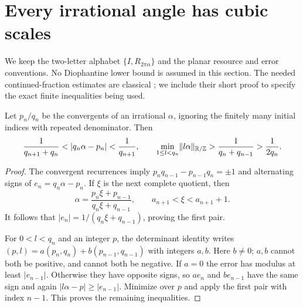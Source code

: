 \section{Every irrational angle has cubic scales}\label{sec:irrational}
We keep the two-letter alphabet $\{I,R_{2\pi\alpha}\}$ and the planar resource and error conventions. No Diophantine lower bound is assumed in this section. The needed continued-fraction estimates are classical \cite{Cassels}; we include their short proof to specify the exact finite inequalities being used.

\begin{lemma}\label{lem:cf}
Let $p_n/q_n$ be the convergents of an irrational $\alpha$, ignoring the finitely many initial indices with repeated denominator. Then
\begin{equation}\label{eq:cf-estimates}
 \frac1{q_{n+1}+q_n}<|q_n\alpha-p_n|<\frac1{q_{n+1}},
 \qquad
 \min_{1\le l<q_n}\norm{l\alpha}_{\R/\Z}>
                  \frac1{q_n+q_{n-1}}>\frac1{2q_n}.
\end{equation}
\end{lemma}
\begin{proof}
The convergent recurrences imply
$p_nq_{n-1}-p_{n-1}q_n=\pm1$ and alternating signs of $e_n=q_n\alpha-p_n$. If $\xi$ is the next complete quotient, then
\[
 \alpha=\frac{p_n\xi+p_{n-1}}{q_n\xi+q_{n-1}},\qquad
 a_{n+1}<\xi<a_{n+1}+1.
\]
It follows that $|e_n|=1/(q_n\xi+q_{n-1})$, proving the first pair.

For $0<l<q_n$ and an integer $p$, the determinant identity writes
$(p,l)=a(p_n,q_n)+b(p_{n-1},q_{n-1})$ with integers $a,b$. Here $b\ne0$; $a,b$ cannot both be positive, and cannot both be negative. If $a=0$ the error has modulus at least $|e_{n-1}|$. Otherwise they have opposite signs, so $ae_n$ and $be_{n-1}$ have the same sign and again
$|l\alpha-p|\ge|e_{n-1}|$. Minimize over $p$ and apply the first pair with index $n-1$. This proves the remaining inequalities.
\end{proof}

